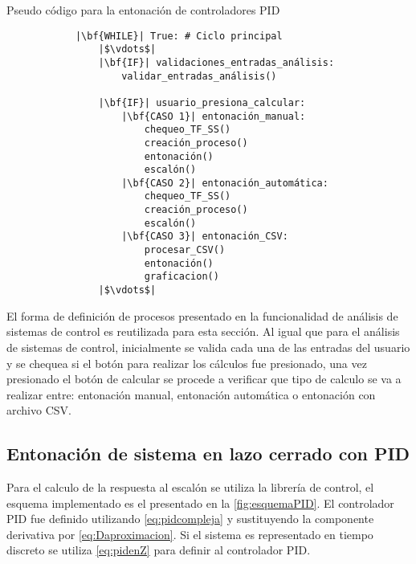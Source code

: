     \begin{longlisting}
        \caption{Pseudo código para la entonación de controladores PID}
        \label{code:entonacion}				
        \begin{verbatim}
            |\bf{WHILE}| True: # Ciclo principal
                |$\vdots$|
                |\bf{IF}| validaciones_entradas_análisis:
                    validar_entradas_análisis()
                
                |\bf{IF}| usuario_presiona_calcular:
                    |\bf{CASO 1}| entonación_manual:
                        chequeo_TF_SS()
                        creación_proceso()
                        entonación()
                        escalón()
                    |\bf{CASO 2}| entonación_automática:
                        chequeo_TF_SS()
                        creación_proceso()
                        escalón()
                    |\bf{CASO 3}| entonación_CSV:
                        procesar_CSV()
                        entonación()
                        graficacion()
                |$\vdots$|
        \end{verbatim}
    \end{longlisting}

    El forma de definición de procesos presentado en la funcionalidad de análisis de sistemas de control es reutilizada para esta sección. Al igual que para el análisis de sistemas de control, inicialmente se valida cada una de las entradas del usuario y se chequea si el botón para realizar los cálculos fue presionado, una vez presionado el botón de calcular se procede a verificar que tipo de calculo se va a realizar entre: entonación manual, entonación automática o entonación con archivo CSV.

    \subsection{Entonación de sistema en lazo cerrado con PID}
        
        Para el calculo de la respuesta al escalón se utiliza la librería de control, el esquema implementado es el presentado en la \cref{fig:esquemaPID}. El controlador PID fue definido utilizando \cref{eq:pidcompleja} y sustituyendo la componente derivativa por \cref{eq:Daproximacion}. Si el sistema es representado en tiempo discreto se utiliza \cref{eq:pidenZ} para definir al controlador PID.
        
